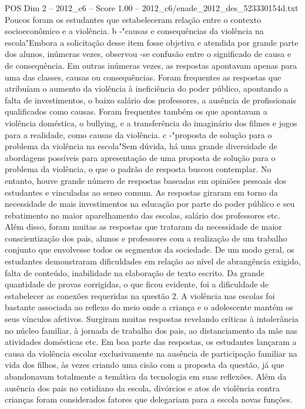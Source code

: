 \begin{textsample}{POS Dim 2 – 2012\_c6 – Score 1.00 – 2012\_c6/enade\_2012\_des\_523330154d.txt}
Poucos foram os estudantes que estabeleceram relação entre o contexto socioeconômico e a violência. b -"causas e consequências da violência na escola"Embora a solicitação desse item fosse objetiva e atendida por grande parte dos alunos, inúmeras vezes, observou -se confusão entre o significado de causa e de consequência.
Em outras inúmeras vezes, as respostas apontavam apenas para uma das classes, causas ou consequências.
Foram frequentes as respostas que atribuíam o aumento da violência à ineficiência do poder público, apontando a falta de investimentos, o baixo salário dos professores, a ausência de profissionais qualificados como causas.
Foram frequentes também os que apontavam a violência doméstica, o bullying, e a transferência do imaginário dos filmes e jogos para a realidade, como causas da violência. c -"proposta de solução para o problema da violência na escola"Sem dúvida, há uma grande diversidade de abordagens possíveis para apresentação de uma proposta de solução para o problema da violência, o que o padrão de resposta buscou contemplar.
No entanto, houve grande número de respostas baseadas em opiniões pessoais dos estudantes e vinculadas ao senso comum.
As respostas giraram em torno da necessidade de mais investimentos na educação por parte do poder público e seu rebatimento no maior aparelhamento das escolas, salário dos professores etc.
Além disso, foram muitas as respostas que trataram da necessidade de maior conscientização dos pais, alunos e professores com a realização de um trabalho conjunto que envolvesse todos os segmentos da sociedade.
De um modo geral, os estudantes demonstraram dificuldades em relação ao nível de abrangência exigido, falta de conteúdo, inabilidade na elaboração de texto escrito.
Da grande quantidade de provas corrigidas, o que ficou evidente, foi a dificuldade de estabelecer as conexões requeridas na questão 2.
A violência nas escolas foi bastante associada ao reflexo do meio onde a criança e o adolescente mantém os seus vínculos afetivos.
Surgiram muitas respostas revelando críticas à intolerância no núcleo familiar, à jornada de trabalho dos pais, ao distanciamento da mãe nas atividades domésticas etc.
Em boa parte das respostas, os estudantes lançaram a causa da violência escolar exclusivamente na ausência de participação familiar na vida dos filhos, às vezes criando uma cisão com a proposta da questão, já que abandonavam totalmente a temática da tecnologia em suas reflexões.
Além da ausência dos pais no cotidiano da escola, divórcios e atos de violência contra crianças foram considerados fatores que delegariam para a escola novas funções.

\end{textsample}
